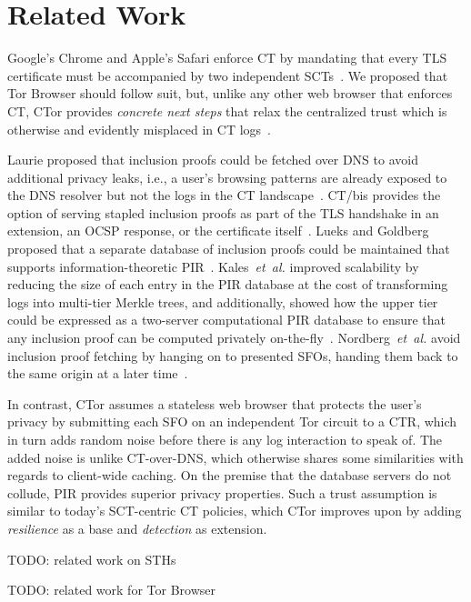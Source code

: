 \section{Related Work} \label{sec:related}
Google's Chrome and Apple's Safari enforce CT by mandating that every TLS
certificate must be accompanied by two independent
SCTs~\cite{chrome-policy,safari-policy}.  We proposed that Tor Browser should
follow suit, but, unlike any other web browser that enforces CT, CTor provides
\emph{concrete next steps} that relax the centralized trust which is otherwise
and evidently misplaced in CT logs~\cite{%
	izenpe-disqualified,%
	venafi-disqualified,%
	gdca1-omission,%
	digicert-log-compromised%
}.

Laurie proposed that inclusion proofs could be fetched over DNS to avoid
additional privacy leaks, i.e., a user's browsing patterns are already exposed
to the DNS resolver but not the logs in the CT landscape~\cite{ct-over-dns}.
CT/bis provides the option of serving stapled inclusion proofs as part of the
TLS handshake in an extension, an OCSP response, or the certificate
itself~\cite{ct/bis}.
Lueks and Goldberg proposed that a separate database of inclusion proofs could
be maintained that supports information-theoretic PIR~\cite{lueks-and-goldberg}.
Kales~\emph{et~al.} improved scalability by reducing the size of each entry
in the PIR database at the cost of transforming logs into multi-tier Merkle
trees, and additionally, showed how the upper tier could be expressed as
a two-server computational PIR database to ensure that any inclusion proof can
be computed privately on-the-fly~\cite{kales}.
Nordberg~\emph{et~al.} avoid inclusion proof fetching by hanging on to presented
SFOs, handing them back to the same origin at a later time~\cite{nordberg}.

In contrast, CTor assumes a stateless web browser that protects the user's
privacy by submitting each SFO on an independent Tor circuit to a CTR, which in
turn adds random noise before there is any log interaction to speak of.  The
added noise is unlike CT-over-DNS, which otherwise shares some similarities
with regards to client-wide caching.  On the premise that the database servers
do not collude, PIR provides superior privacy properties.  Such a trust
assumption is similar to today's SCT-centric CT policies, which CTor improves
upon by adding \emph{resilience} as a base and \emph{detection} as extension.

TODO: related work on STHs

TODO: related work for Tor Browser
